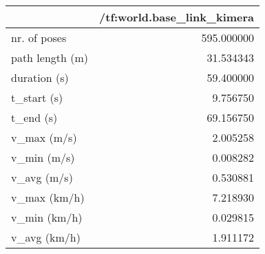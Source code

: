 \begin{tabular}{lr}
\toprule
{} &  /tf:world.base\_link\_kimera \\
\midrule
nr. of poses    &                  595.000000 \\
path length (m) &                   31.534343 \\
duration (s)    &                   59.400000 \\
t\_start (s)     &                    9.756750 \\
t\_end (s)       &                   69.156750 \\
v\_max (m/s)     &                    2.005258 \\
v\_min (m/s)     &                    0.008282 \\
v\_avg (m/s)     &                    0.530881 \\
v\_max (km/h)    &                    7.218930 \\
v\_min (km/h)    &                    0.029815 \\
v\_avg (km/h)    &                    1.911172 \\
\bottomrule
\end{tabular}
